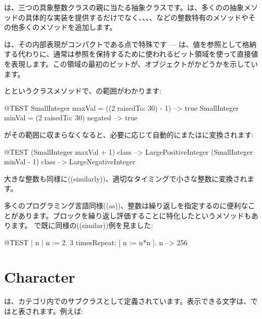 \documentclass[a4paper,10pt,twoside]{book}
\begin{document}
は、三つの具象整数クラスの親に当たる抽象クラスです。は、多くのの抽象メソッドの具体的な実装を提供するだけでなく、、、、などの整数特有のメソッドやその他多くのメソッドを追加します。

は、その内部表現がコンパクトである点で特殊です --- は、値を参照として格納する代わりに、通常は参照を保持するために使われるビット領域を使って直接値を表現します。この領域の最初のビットが、オブジェクトがかどうかを示しています。

とというクラスメソッドで、の範囲がわかります:

\begin{code}{@TEST}
SmallInteger maxVal = ((2 raisedTo: 30) - 1)      --> true
SmallInteger minVal = (2 raisedTo: 30) negated --> true
\end{code}

がその範囲に収まらなくなると、必要に応じて自動的にまたはに変換されます:

\begin{code}{@TEST}
(SmallInteger maxVal + 1) class --> LargePositiveInteger
(SmallInteger minVal - 1) class  --> LargeNegativeInteger
\end{code}

大きな整数も同様に((similarly))、適切なタイミングで小さな整数に変換されます。

多くのプログラミング言語同様((as))、整数は繰り返しを指定するのに便利なことがあります。ブロックを繰り返し評価することに特化したというメソッドもあります。
で既に同様の((similar))例を見ました:
\begin{code}{@TEST | n |}
n := 2.
3 timesRepeat: [ n := n*n ].
n --> 256
\end{code}

\section{Character}

は、カテゴリ内でのサブクラスとして定義されています。表示できる文字は、\pharo ではと表されます。例えば:
\end{document}
